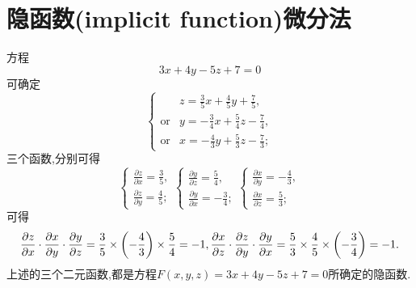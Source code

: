 \section{隐函数(implicit function)微分法}
\begin{example}
    方程$$3x+4y-5z+7=0$$可确定$$
    \begin{cases}
        &z=\frac{3}{5}x+\frac{4}{5}y+\frac{7}{5},\\
        \text{or}& y=-\frac{3}{4}x+\frac{5}{4}z-\frac{7}{4},\\
        \text{or}& x=-\frac{4}{3}y+\frac{5}{3}z-\frac{7}{3};
    \end{cases}$$
    三个函数,分别可得
    $$
    \begin{cases}
        \frac{\partial z}{\partial x}=\frac{3}{5},\\
        \frac{\partial z}{\partial y}=\frac{4}{5};
    \end{cases}
    \begin{cases}
        \frac{\partial y}{\partial z}=\frac{5}{4},\\
        \frac{\partial y}{\partial x}=-\frac{3}{4};
    \end{cases}
    \begin{cases}
        \frac{\partial x}{\partial y}=-\frac{4}{3},\\
        \frac{\partial x}{\partial z}=\frac{5}{3};
    \end{cases}
    $$
    可得
    $$
    \frac{\partial z}{\partial x}\cdot\frac{\partial x}{\partial y}\cdot\frac{\partial y}{\partial z}=\frac{3}{5}\times\left(-\frac{4}{3}\right)\times\frac{5}{4}=-1,\\
    \frac{\partial x}{\partial z}\cdot\frac{\partial z}{\partial y}\cdot\frac{\partial y}{\partial x}=\frac{5}{3}\times\frac{4}{5}\times\left(-\frac{3}{4}\right)=-1.
    $$
    上述的三个二元函数,都是方程$F(x,y,z)=3x+4y-5z+7=0$所确定的隐函数.
\end{example}

